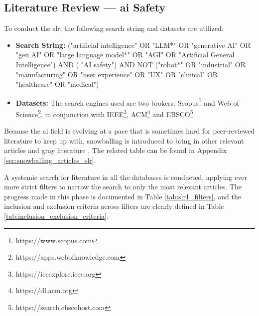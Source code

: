 \begin{reviewed}

\chapter{Literature Review — \gls{ai} Safety}\label{chap:literature_review}

	To conduct the \gls{slr}, the following search string and datasets are utilized:

	\begin{itemize}
		\item \textbf{Search String:} ("artificial intelligence" OR "LLM*" OR "generative AI" OR "gen AI" OR "large language model*" OR "AGI" OR "Artificial General Intelligence") AND ( "AI safety") AND NOT ("robot*" OR "industrial" OR "manufacturing" OR "user experience" OR "UX" OR "clinical" OR "healthcare" OR "medical")
		\item \textbf{Datasets:} The search engines used are two brokers: Scopus\footnote{https://www.scopus.com} and Web of Science\footnote{https://apps.webofknowledge.com}, in conjunction with IEEE\footnote{https://ieeexplore.ieee.org}, ACM\footnote{https://dl.acm.org} and EBSCO\footnote{https://search.ebscohost.com}.
	\end{itemize}

	Because the \gls{ai} field is evolving at a pace that is sometimes hard for peer-reviewed literature to keep up with, snowballing is introduced to bring in other relevant articles and gray literature \cite{wohlin_guidelines_2014}. The related table can be found in Appendix \ref{sec:snowballing_articles_slr}.

	A systemic search for literature in all the databases is conducted, applying ever more strict filters to narrow the search to only the most relevant articles. The progress made in this phase is documented in Table \ref{tab:slr1_filters}, and the inclusion and exclusion criteria across filters are clearly defined in Table \ref{tab:inclusion_exclusion_criteria}. 


\end{reviewed}

